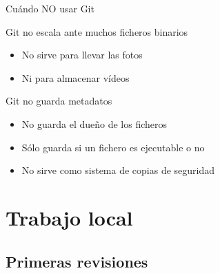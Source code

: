 \documentclass[xcolor=svgnames]{beamer}
\begin{document}
\begin{frame}{Cuándo NO usar Git}

  \begin{block}{Git no escala ante muchos ficheros binarios}
    \begin{itemize}
    \item No sirve para llevar las fotos
    \item Ni para almacenar vídeos
    \end{itemize}
  \end{block}

  \begin{block}{Git no guarda metadatos}
    \begin{itemize}
    \item No guarda el dueño de los ficheros
    \item Sólo guarda si un fichero es ejecutable o no
    \item No sirve como sistema de copias de seguridad
    \end{itemize}
  \end{block}

\end{frame}

\section[Local]{Trabajo local}

\subsection{Primeras revisiones}
\end{document}
